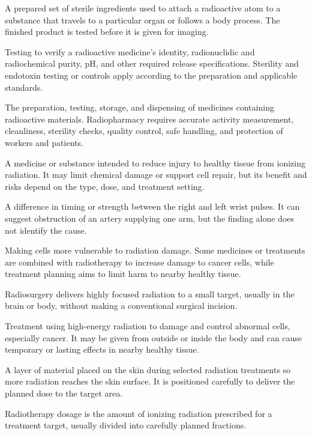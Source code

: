  A prepared set of sterile ingredients used to attach a radioactive atom to a substance that travels to a particular organ or follows a body process. The finished product is tested before it is given for imaging.

 Testing to verify a radioactive medicine's identity, radionuclidic and radiochemical purity, pH, and other required release specifications. Sterility and endotoxin testing or controls apply according to the preparation and applicable standards.

 The preparation, testing, storage, and dispensing of medicines containing radioactive materials. Radiopharmacy requires accurate activity measurement, cleanliness, sterility checks, quality control, safe handling, and protection of workers and patients.

 A medicine or substance intended to reduce injury to healthy tissue from ionizing radiation. It may limit chemical damage or support cell repair, but its benefit and risks depend on the type, dose, and treatment setting.

 A difference in timing or strength between the right and left wrist pulses. It can suggest obstruction of an artery supplying one arm, but the finding alone does not identify the cause.

 Making cells more vulnerable to radiation damage. Some medicines or treatments are combined with radiotherapy to increase damage to cancer cells, while treatment planning aims to limit harm to nearby healthy tissue.

 Radiosurgery delivers highly focused radiation to a small target, usually in the brain or body, without making a conventional surgical incision.

 Treatment using high-energy radiation to damage and control abnormal cells, especially cancer. It may be given from outside or inside the body and can cause temporary or lasting effects in nearby healthy tissue.

 A layer of material placed on the skin during selected radiation treatments so more radiation reaches the skin surface. It is positioned carefully to deliver the planned dose to the target area.

 Radiotherapy dosage is the amount of ionizing radiation prescribed for a treatment target, usually divided into carefully planned fractions.

